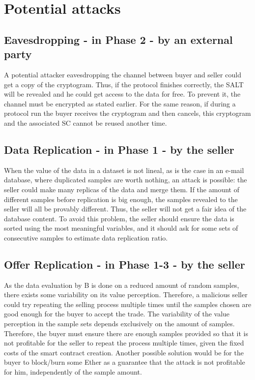 \documentclass[]{article}
\begin{document}
\section{Potential attacks}
\subsection{Eavesdropping - in Phase 2 - by an external party}
A potential attacker eavesdropping the channel between buyer and seller could get a copy of the cryptogram. Thus, if the protocol finishes correctly, the SALT will be revealed and he could get access to the data for free. To prevent it, the channel must be encrypted as stated earlier. For the same reason, if during a protocol run the buyer receives the cryptogram and then cancels, this cryptogram and the associated SC cannot be reused another time.

\subsection{Data Replication - in Phase 1 - by the seller} 
When the value of the data in a dataset is not lineal, as is the case in an e-mail database, where duplicated samples are worth nothing, an attack is possible: the seller could make many replicas of the data and merge them. If the amount of different samples before replication is big enough, the samples revealed to the seller will all be provably different. Thus, the seller will not get a fair idea of the database content.
To avoid this problem, the seller should ensure the data is sorted using the most meaningful variables, and it should ask for some sets of consecutive samples to estimate data replication ratio.

\subsection{Offer Replication - in Phase 1-3 - by the seller} 
As the data evaluation by B is done on a reduced amount of random samples, there exists some variability on its value perception. Therefore, a malicious seller could try repeating the selling process multiple times until the samples chosen are good enough for the buyer to accept the trade.
The variability of the value perception in the sample sets depends exclusively on the amount of samples. Therefore, the buyer must ensure there are enough samples provided so that it is not profitable for the seller to repeat the process multiple times, given the fixed costs of the smart contract creation.
Another possible solution would be for the buyer to block/burn some Ether as a guarantee that the attack is not profitable for him, independently of the sample amount.
\end{document}
